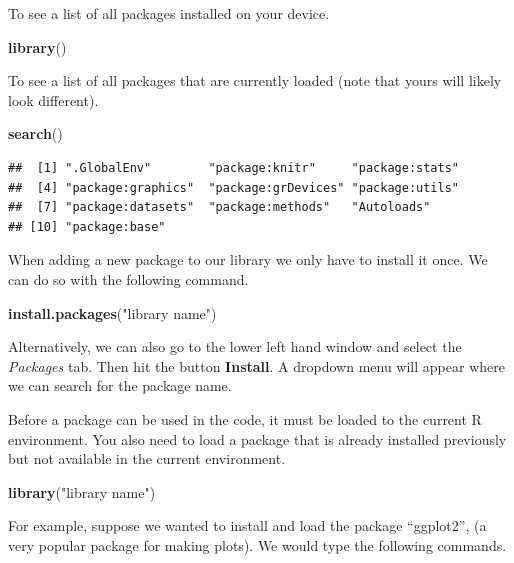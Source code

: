 \documentclass[
]{book}
\newenvironment{Shaded}{\begin{snugshade}}{\end{snugshade}}
\newcommand{\KeywordTok}[1]{\textcolor[rgb]{0.13,0.29,0.53}{\textbf{#1}}}
\newcommand{\NormalTok}[1]{#1}
\newcommand{\StringTok}[1]{\textcolor[rgb]{0.31,0.60,0.02}{#1}}
\begin{document}
To see a list of all packages installed on your device.

\begin{Shaded}
\begin{Highlighting}[]
\KeywordTok{library}\NormalTok{()}
\end{Highlighting}
\end{Shaded}

To see a list of all packages that are currently loaded (note that yours will likely look different).

\begin{Shaded}
\begin{Highlighting}[]
\KeywordTok{search}\NormalTok{()}
\end{Highlighting}
\end{Shaded}

\begin{verbatim}
##  [1] ".GlobalEnv"        "package:knitr"     "package:stats"    
##  [4] "package:graphics"  "package:grDevices" "package:utils"    
##  [7] "package:datasets"  "package:methods"   "Autoloads"        
## [10] "package:base"
\end{verbatim}

When adding a new package to our library we only have to install it once. We can do so with the following command.

\begin{Shaded}
\begin{Highlighting}[]
\KeywordTok{install.packages}\NormalTok{(}\StringTok{"library name"}\NormalTok{)}
\end{Highlighting}
\end{Shaded}

Alternatively, we can also go to the lower left hand window and select the \emph{Packages} tab. Then hit the button \textbf{Install}. A dropdown menu will appear where we can search for the package name.

Before a package can be used in the code, it must be loaded to the current R environment. You also need to load a package that is already installed previously but not available in the current environment.

\begin{Shaded}
\begin{Highlighting}[]
\KeywordTok{library}\NormalTok{(}\StringTok{"library name"}\NormalTok{)}
\end{Highlighting}
\end{Shaded}

For example, suppose we wanted to install and load the package ``ggplot2'', (a very popular package for making plots). We would type the following commands.
\end{document}
